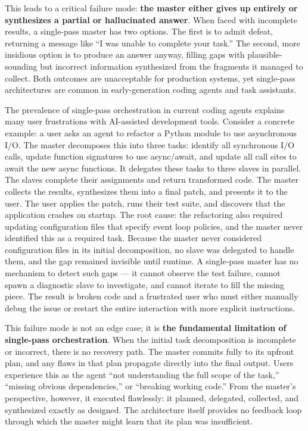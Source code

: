 This leads to a critical failure mode: \textbf{the master either gives up entirely or synthesizes a partial or hallucinated answer}. When faced with incomplete results, a single-pass master has two options. The first is to admit defeat, returning a message like ``I was unable to complete your task.'' The second, more insidious option is to produce an answer anyway, filling gaps with plausible-sounding but incorrect information synthesized from the fragments it managed to collect. Both outcomes are unacceptable for production systems, yet single-pass architectures are common in early-generation coding agents and task assistants.

The prevalence of single-pass orchestration in current coding agents explains many user frustrations with AI-assisted development tools. Consider a concrete example: a user asks an agent to refactor a Python module to use asynchronous I/O. The master decomposes this into three tasks: identify all synchronous I/O calls, update function signatures to use async/await, and update all call sites to await the new async functions. It delegates these tasks to three slaves in parallel. The slaves complete their assignments and return transformed code. The master collects the results, synthesizes them into a final patch, and presents it to the user. The user applies the patch, runs their test suite, and discovers that the application crashes on startup. The root cause: the refactoring also required updating configuration files that specify event loop policies, and the master never identified this as a required task. Because the master never considered configuration files in its initial decomposition, no slave was delegated to handle them, and the gap remained invisible until runtime. A single-pass master has no mechanism to detect such gaps — it cannot observe the test failure, cannot spawn a diagnostic slave to investigate, and cannot iterate to fill the missing piece. The result is broken code and a frustrated user who must either manually debug the issue or restart the entire interaction with more explicit instructions.

This failure mode is not an edge case; it is \textbf{the fundamental limitation of single-pass orchestration}. When the initial task decomposition is incomplete or incorrect, there is no recovery path. The master commits fully to its upfront plan, and any flaws in that plan propagate directly into the final output. Users experience this as the agent ``not understanding the full scope of the task,'' ``missing obvious dependencies,'' or ``breaking working code.'' From the master's perspective, however, it executed flawlessly: it planned, delegated, collected, and synthesized exactly as designed. The architecture itself provides no feedback loop through which the master might learn that its plan was insufficient.

